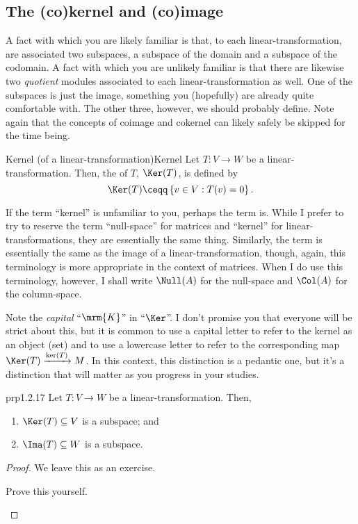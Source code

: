 \subsection{The (co)kernel and (co)image}

A fact with which you are likely familiar is that, to each linear-transformation, are associated two subspaces, a subspace of the domain and a subspace of the codomain.  A fact with which you are unlikely familiar is that there are likewise two \emph{quotient} modules associated to each linear-transformation as well.  One of the subspaces is just the image, something you (hopefully) are already quite comfortable with.  The other three, however, we should probably define.  Note again that the concepts of coimage and cokernel can likely safely be skipped for the time being.
\begin{dfn}{Kernel (of a linear-transformation)}{Kernel}
	Let $T\colon V\rightarrow W$ be a linear-transformation.  Then, the  of $T$, $\Ker (T)$, is defined by
	\begin{equation}
	\Ker (T)\ceqq \left\{ v\in V:T(v)=0\right\} .
	\end{equation}
	\begin{rmk}
		If the term ``kernel'' is unfamiliar to you, perhaps the term  is.  While I prefer to try to reserve the term ``null-space'' for matrices and ``kernel'' for linear-transformations, they are essentially the same thing.  Similarly, the term is essentially the same as the image of a linear-transformation, though, again, this terminology is more appropriate in the context of matrices.  When I do use this terminology, however, I shall write $\Null (A)$ for the null-space and $\Col (A)$ for the column-space.
	\end{rmk}
	\begin{rmk}
		Note the \emph{capital} ``$\mrm{K}$'' in ``$\Ker$''.    I don't promise you that everyone will be strict about this, but it is common to use a capital letter to refer to the kernel as an object (set) and to use a lowercase letter to refer to the corresponding map $\Ker (T)\xrightarrow{\ker (T)}M$.  In this context, this distinction is a pedantic one, but it's a distinction that will matter as you progress in your studies.
	\end{rmk}
\end{dfn}
\begin{prp}{}{prp1.2.17}
	Let $T\colon V\rightarrow W$ be a linear-transformation.  Then,
	\begin{enumerate}
		\item $\Ker (T)\subseteq V$ is a subspace; and
		\item $\Ima (T)\subseteq W$ is a subspace.
	\end{enumerate}
	\begin{proof}
		We leave this as an exercise.
		\begin{exr}[breakable=false]{}{}
			Prove this yourself.
		\end{exr}
	\end{proof}
\end{prp}
